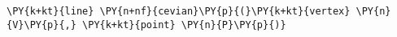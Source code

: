 \begin{Verbatim}[commandchars=\\\{\}]
    \PY{k+kt}{line} \PY{n+nf}{cevian}\PY{p}{(}\PY{k+kt}{vertex} \PY{n}{V}\PY{p}{,} \PY{k+kt}{point} \PY{n}{P}\PY{p}{)}
\end{Verbatim}

